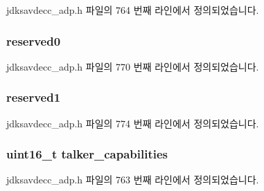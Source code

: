 jdksavdecc\+\_\+adp.\+h 파일의 764 번째 라인에서 정의되었습니다.

\subsubsection[{\texorpdfstring{reserved0}{reserved0}}]{ reserved0}\hypertarget{structjdksavdecc__adpdu_aed93283265f941dc1d2bf8d634164493}{}\label{structjdksavdecc__adpdu_aed93283265f941dc1d2bf8d634164493}


jdksavdecc\+\_\+adp.\+h 파일의 770 번째 라인에서 정의되었습니다.

\subsubsection[{\texorpdfstring{reserved1}{reserved1}}]{ reserved1}\hypertarget{structjdksavdecc__adpdu_aef9bb556c1530f5d648fd57e73b9a105}{}\label{structjdksavdecc__adpdu_aef9bb556c1530f5d648fd57e73b9a105}


jdksavdecc\+\_\+adp.\+h 파일의 774 번째 라인에서 정의되었습니다.

\subsubsection[{\texorpdfstring{talker\+\_\+capabilities}{talker_capabilities}}]{\setlength{\rightskip}{0pt plus 5cm}uint16\+\_\+t talker\+\_\+capabilities}\hypertarget{structjdksavdecc__adpdu_a51f25c5187ed3f58d17c11e1dc0f3352}{}\label{structjdksavdecc__adpdu_a51f25c5187ed3f58d17c11e1dc0f3352}


jdksavdecc\+\_\+adp.\+h 파일의 763 번째 라인에서 정의되었습니다.

